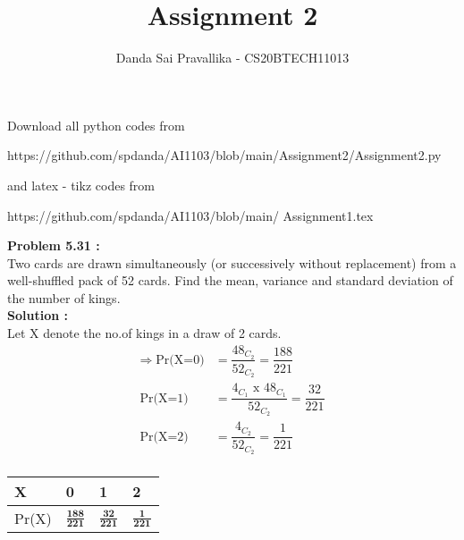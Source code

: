 \documentclass[journal,12pt,twocolumn]{IEEEtran}
\title{Assignment 2}
\author{Danda Sai Pravallika  - CS20BTECH11013}
\begin{document}
\maketitle
Download all python codes from
\begin{tcolorbox}
https://github.com/spdanda/AI1103/blob/main/Assignment2/Assignment2.py
\end{tcolorbox}
and latex - tikz codes from 
\begin{tcolorbox}
https://github.com/spdanda/AI1103/blob/main/
Assignment1.tex
\end{tcolorbox}
\large\textbf{Problem 5.31 :}\\
Two cards are drawn simultaneously (or successively without replacement) from a well-shuffled  pack  of  52  cards.  Find  the  mean, variance and standard deviation of the number of kings.\\
\textbf{Solution :}\\
Let X denote the no.of kings in a draw of 2 cards.
\begin{align*}
\Longrightarrow\; \text{Pr(X=0)} &= \dfrac{48_{C_2}}{52_{C_2}}=\dfrac{188}{221} \\
\text{Pr(X=1)} &= \dfrac{4_{C_1}\text{ x }48_{C_1}}{52_{C_2}}=\dfrac{32}{221} \\ 
\text{Pr(X=2)}&=\dfrac{4_{C_2}}{52_{C_2}}= \dfrac{1}{221}\\
\end{align*}
\vspace*{-2cm}
\begin{center}
\begin{tabular}{ | m{1.2cm} | m{1.5cm}| m{1.5cm} | m{1.5cm} | } 
\hline \vspace{2pt}

\large X     & \hspace{0.5cm}0                & \hspace{0.5cm}1               & \hspace{0.5cm}2             \\ \hline \vspace{6pt}
\large Pr(X) & \hspace{0.5cm}\(\frac{\textbf{188}}{\textbf{221}}\) & \hspace{0.5cm}\(\frac{\textbf{32}}{\textbf{221}}\) & \;\;\;\(\frac{\textbf{1}}{\textbf{221}}\)\\ 
\hline
\end{tabular}
\end{center}
\vspace{0.3cm}
\end{document}
